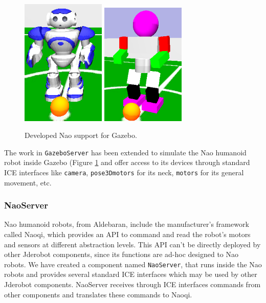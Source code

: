 \documentclass[twocolumn]{svjour3}          %
\begin{document}
\begin{figure}[h!]
  \includegraphics[width=4cm]{nao_piel.png}
  \includegraphics[width=4cm]{nao_sinPiel.png}
\caption{Developed Nao support for Gazebo.}
\label{fig:naogazebo}
\end{figure}

The work in \texttt{GazeboServer} has been extended to simulate the Nao humanoid robot inside Gazebo (Figure \ref{fig:naogazebo} and offer access to its devices through standard ICE interfaces like \texttt{camera}, \texttt{pose3Dmotors} for its neck, \texttt{motors} for its general movement, etc.

\subsubsection{NaoServer}

Nao humanoid robots, from Aldebaran, include the manufacturer's framework called Naoqi, which provides an API to command and read the robot's motors and sensors at different abstraction levels. This API can't be directly deployed by other Jderobot components, since its functions are ad-hoc designed to Nao robots. We have created a component named \texttt{NaoServer}, that runs inside the Nao robots and provides several standard ICE interfaces which may be used by other Jderobot components. NaoServer receives through ICE interfaces commands from other components and translates these commands to Naoqi.
\end{document}
